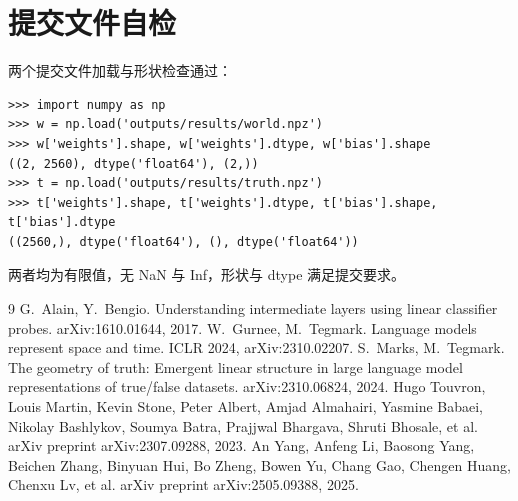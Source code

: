 \documentclass[UTF8,11pt,a4paper]{article}
\begin{document}
\section{提交文件自检}
\label{app:check}

两个提交文件加载与形状检查通过：
\begin{lstlisting}
>>> import numpy as np
>>> w = np.load('outputs/results/world.npz')
>>> w['weights'].shape, w['weights'].dtype, w['bias'].shape
((2, 2560), dtype('float64'), (2,))
>>> t = np.load('outputs/results/truth.npz')
>>> t['weights'].shape, t['weights'].dtype, t['bias'].shape, t['bias'].dtype
((2560,), dtype('float64'), (), dtype('float64'))
\end{lstlisting}
两者均为有限值，无 NaN 与 Inf，形状与 dtype 满足提交要求。

\begin{thebibliography}{9}
 G.~Alain, Y.~Bengio. Understanding intermediate layers using linear classifier probes. arXiv:1610.01644, 2017.
 W.~Gurnee, M.~Tegmark. Language models represent space and time. ICLR 2024, arXiv:2310.02207.
 S.~Marks, M.~Tegmark. The geometry of truth: Emergent linear structure in large language model representations of true/false datasets. arXiv:2310.06824, 2024.
 Hugo Touvron, Louis Martin, Kevin Stone, Peter Albert, Amjad Almahairi, Yasmine Babaei, Nikolay Bashlykov, Soumya Batra, Prajjwal Bhargava, Shruti Bhosale, et al. arXiv preprint arXiv:2307.09288, 2023.
An Yang, Anfeng Li, Baosong Yang, Beichen Zhang, Binyuan Hui, Bo Zheng,
Bowen Yu, Chang Gao, Chengen Huang, Chenxu Lv, et al. arXiv preprint arXiv:2505.09388, 2025.
\end{thebibliography}
\end{document}
